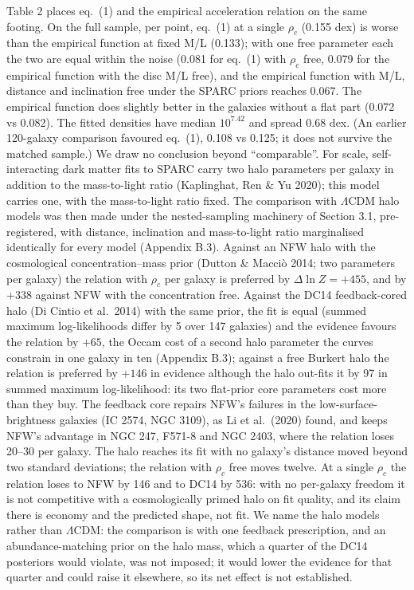 \documentclass[
  10pt,
]{article}
\begin{document}
Table 2 places eq.~(1) and the empirical acceleration relation on the
same footing. On the full sample, per point, eq.~(1) at a single $\rho_c$ (0.155 dex) is worse than the empirical function at fixed M/L (0.133); with one free parameter each the two are equal within the noise (0.081 for eq.~(1) with $\rho_c$ free, 0.079 for the empirical function with the disc M/L free), and the empirical function with M/L, distance and inclination free under the SPARC priors reaches 0.067. The empirical function does slightly better in the galaxies without a flat part (0.072 vs 0.082). The fitted densities have median $10^{7.42}$ and spread 0.68 dex. (An earlier 120-galaxy comparison favoured eq.~(1), 0.108 vs 0.125; it does not survive the matched sample.) We draw no conclusion beyond ``comparable''. For scale, self-interacting dark matter fits to SPARC carry two halo parameters per galaxy in addition to the mass-to-light ratio (Kaplinghat, Ren \& Yu 2020); this model carries one, with the mass-to-light ratio fixed. The comparison with $\Lambda$CDM halo models was then made under the nested-sampling machinery of Section 3.1, pre-registered, with distance, inclination and mass-to-light ratio marginalised identically for every model (Appendix B.3). Against an NFW halo with the cosmological concentration--mass prior (Dutton \& Macci\`o 2014; two parameters per galaxy) the relation with $\rho_c$ per galaxy is preferred by $\Delta\ln Z=+455$, and by $+338$ against NFW with the concentration free. Against the DC14 feedback-cored halo (Di Cintio et al.~2014) with the same prior, the fit is equal (summed maximum log-likelihoods differ by 5 over 147 galaxies) and the evidence favours the relation by $+65$, the Occam cost of a second halo parameter the curves constrain in one galaxy in ten (Appendix B.3); against a free Burkert halo the relation is preferred by $+146$ in evidence although the halo out-fits it by 97 in summed maximum log-likelihood: its two flat-prior core parameters cost more than they buy. The feedback core repairs NFW's failures in the low-surface-brightness galaxies (IC 2574, NGC 3109), as Li et al.~(2020) found, and keeps NFW's advantage in NGC 247, F571-8 and NGC 2403, where the relation loses 20--30 per galaxy. The halo reaches its fit with no galaxy's distance moved beyond two standard deviations; the relation with $\rho_c$ free moves twelve. At a single $\rho_c$ the relation loses to NFW by 146 and to DC14 by 536: with no per-galaxy freedom it is not competitive with a cosmologically primed halo on fit quality, and its claim there is economy and the predicted shape, not fit. We name the halo models rather than $\Lambda$CDM: the comparison is with one feedback prescription, and an abundance-matching prior on the halo mass, which a quarter of the DC14 posteriors would violate, was not imposed; it would lower the evidence for that quarter and could raise it elsewhere, so its net effect is not established.
\end{document}
